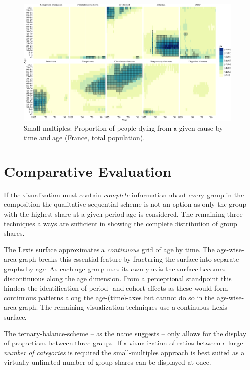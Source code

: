 \documentclass[a4paper]{scrartcl}
\begin{document}
\begin{landscape}

\begin{figure}[htb!]
  \centering
  \includegraphics[width = \linewidth]{../fig/plot-small_multiples.pdf}
  \caption{Small-multiples: Proportion of people dying from a given cause by time and age (France, total population).}
  \label{fig:smg}
\end{figure}

\end{landscape}

\section*{Comparative Evaluation}

If the visualization must contain \emph{complete} information about every group in the composition the qualitative-sequential-scheme is not an option as only the group with the highest share at a given period-age is considered. The remaining three techniques always are sufficient in showing the complete distribution of group shares.

The Lexis surface approximates a \emph{continuous} grid of age by time. The age-wise-area graph breaks this essential feature by fracturing the surface into separate graphs by age. As each age group uses its own y-axis the surface becomes discontinuous along the age dimension. From a perceptional standpoint this hinders the identification of period- and cohort-effects as these would form continuous patterns along the age-(time)-axes but cannot do so in the age-wise-area-graph. The remaining visualization techniques use a continuous Lexis surface.

The ternary-balance-scheme -- as the name suggests -- only allows for the display of proportions between three groups. If a visualization of ratios between a large \emph{number of categories} is required the small-multiples approach is best suited as a virtually unlimited number of group shares can be displayed at once.
\end{document}
